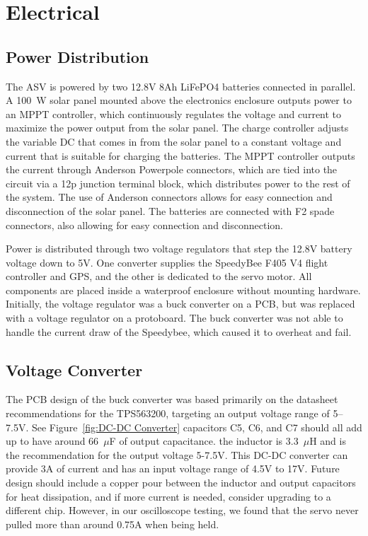 \section{Electrical}

\subsection{Power Distribution}
The ASV is powered by two 12.8V 8Ah LiFePO4 batteries connected in parallel. A \SI{100}{\watt} solar panel mounted above the electronics enclosure outputs power to an MPPT controller, which continuously regulates the voltage and current to maximize the power output from the solar panel. The charge controller adjusts the variable DC that comes in from the solar panel to a constant voltage and current that is suitable for charging the batteries. The MPPT controller outputs the current through Anderson Powerpole connectors, which are tied into the circuit via a 12p junction terminal block, which distributes power to the rest of the system. The use of Anderson connectors allows for easy connection and disconnection of the solar panel. The batteries are connected with F2 spade connectors, also allowing for easy connection and disconnection.

Power is distributed through two voltage regulators that step the 12.8V battery voltage down to 5V. One converter supplies the SpeedyBee F405 V4 flight controller and GPS, and the other is dedicated to the servo motor. All components are placed inside a waterproof enclosure without mounting hardware. Initially, the voltage regulator was a buck converter on a PCB, but was replaced with a voltage regulator on a protoboard. The buck converter was not able to handle the current draw of the Speedybee, which caused it to overheat and fail. 

\subsection{Voltage Converter}
The PCB design of the buck converter was based primarily on the datasheet recommendations for the TPS563200, targeting an output voltage range of 5–7.5V. See Figure~\ref{fig:DC-DC Converter} capacitors C5, C6, and C7 should all add up to have around 66~\(\mu\)F of output capacitance. the inductor is 3.3~\(\mu\)H and is the recommendation for the output voltage 5-7.5V. This DC-DC converter can provide 3A of current and has an input voltage range of 4.5V to 17V. Future design should include a copper pour between the inductor and output capacitors for heat dissipation, and if more current is needed, consider upgrading to a different chip. However, in our oscilloscope testing, we found that the servo never pulled more than around 0.75A when being held. 

